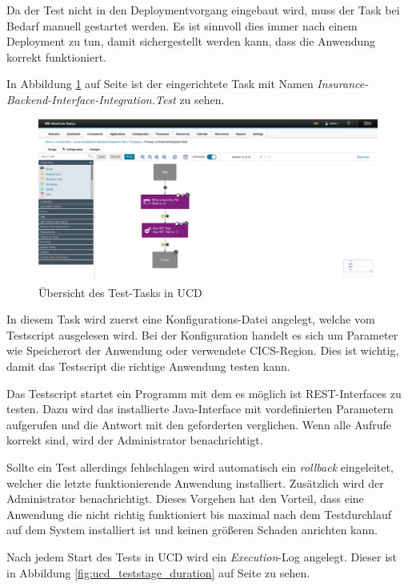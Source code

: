 Da der Test nicht in den Deploymentvorgang eingebaut wird, muss der Task bei Bedarf manuell gestartet werden. Es ist
sinnvoll dies immer nach einem Deployment zu tun, damit sichergestellt werden kann, dass die Anwendung korrekt funktioniert.

In Abbildung \ref{fig:ucd_teststage} auf Seite \pageref{fig:ucd_teststage} ist der eingerichtete Task mit Namen
\textit{Insurance-Backend-Interface-Integration.Test} zu sehen.

\begin{figure}[h]
  \centering
    \includegraphics[scale=0.3]{images/kapitel_5/ucd_teststage.pdf}
  \caption{Übersicht des Test-Tasks in UCD}
  \label{fig:ucd_teststage}
\end{figure}

In diesem Task wird zuerst eine Konfigurations-Datei angelegt, welche vom Testscript ausgelesen wird. Bei der Konfiguration
handelt es sich um Parameter wie Speicherort der Anwendung oder verwendete CICS-Region. Dies ist wichtig, damit das
Testscript die richtige Anwendung testen kann.

Das Testscript startet ein Programm mit dem es möglich ist REST-Interfaces zu testen. Dazu wird das installierte
Java-Interface mit vordefinierten Parametern aufgerufen und die Antwort mit den geforderten verglichen. Wenn alle Aufrufe
korrekt sind, wird der Administrator benachrichtigt.

Sollte ein Test allerdings fehlschlagen wird automatisch ein \textit{rollback} eingeleitet, welcher die letzte funktionierende
Anwendung installiert. Zusätzlich wird der Administrator benachrichtigt. Dieses Vorgehen hat den Vorteil, dass eine
Anwendung die nicht richtig funktioniert bis maximal nach dem Testdurchlauf auf dem System installiert ist und keinen
größeren Schaden anrichten kann.

Nach jedem Start des Tests in UCD wird ein \textit{Execution}-Log angelegt. Dieser ist in Abbildung
\ref{fig:ucd_teststage_duration} auf Seite \pageref{fig:ucd_teststage_duration} zu sehen.

